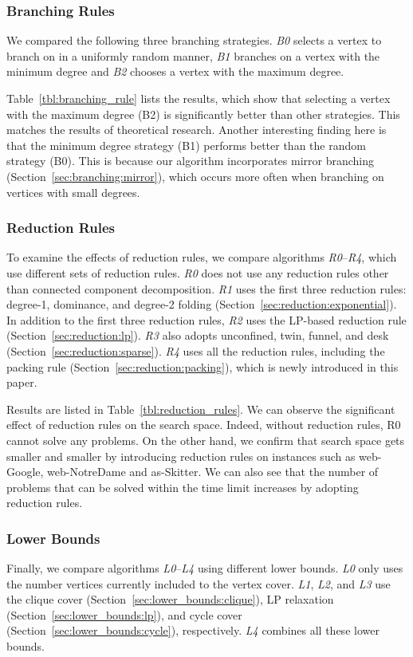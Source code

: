 \documentclass[11pt]{article}
\begin{document}
\subsubsection{Branching Rules}
We compared the following three branching strategies.
\emph{B0} selects a vertex to branch on in a uniformly random manner,
\emph{B1} branches on a vertex with the minimum degree and
\emph{B2} chooses a vertex with the maximum degree.

Table~\ref{tbl:branching_rule} lists the results,
which show that selecting a vertex with the maximum degree (B2)
is significantly better than other strategies.
This matches the results of theoretical research.
Another interesting finding here is that
the minimum degree strategy (B1) performs better than the random strategy (B0).
This is because
our algorithm incorporates mirror branching (Section~\ref{sec:branching:mirror}),
which occurs more often when branching on vertices with small degrees.


\subsubsection{Reduction Rules}
To examine the effects of reduction rules,
we compare algorithms \emph{R0}--\emph{R4},
which use different sets of reduction rules.
\emph{R0} does not use any reduction rules other than connected component decomposition.
\emph{R1} uses the first three reduction rules: degree-1, dominance, and degree-2 folding
(Section~\ref{sec:reduction:exponential}).
In addition to the first three reduction rules, \emph{R2} uses the LP-based reduction rule (Section~\ref{sec:reduction:lp}).
\emph{R3} also adopts unconfined, twin, funnel, and desk (Section~\ref{sec:reduction:sparse}).
\emph{R4} uses all the reduction rules,
including the packing rule (Section~\ref{sec:reduction:packing}),
which is newly introduced in this paper.

Results are listed in Table~\ref{tbl:reduction_rules}.
We can observe the significant effect of reduction rules on the search space.
Indeed, without reduction rules, R0 cannot solve any problems.
On the other hand, we confirm that search space gets smaller and smaller
by introducing reduction rules
on instances such as web-Google, web-NotreDame and as-Skitter.
We can also see that
the number of problems that can be solved within the time limit
increases by adopting reduction rules.


\subsubsection{Lower Bounds}
\label{sec:experiments:lower_bounds}
Finally, we compare algorithms \emph{L0}--\emph{L4}
using different lower bounds.
\emph{L0} only uses the number vertices currently included to the vertex cover.
\emph{L1}, \emph{L2}, and \emph{L3}
use the clique cover (Section~\ref{sec:lower_bounds:clique}),
LP relaxation (Section~\ref{sec:lower_bounds:lp}), and
cycle cover (Section~\ref{sec:lower_bounds:cycle}), respectively.
\emph{L4} combines all these lower bounds.
\end{document}
